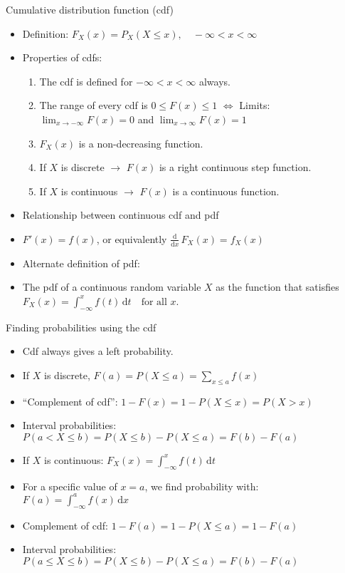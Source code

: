 \documentclass{article}
\newcommand{\ddx}[1]{\frac{\mathrm{d}}{\mathrm{d} #1}\,}		%
\newcommand{\integral}[4]{\int_{#1}^{#2} #3 \,\mathrm{d} #4}		%
\begin{document}
Cumulative distribution function (cdf)
\begin{itemize}
    \item Definition: $F_X(x) = P_X(X \le x),\quad -\infty < x < \infty$
    \item Properties of cdfs:
    \begin{enumerate}
        \item The cdf is defined for $-\infty < x < \infty$ always.
        \item The range of every cdf is $0 \le F(x) \le 1$ $\Longleftrightarrow$ Limits: $\displaystyle \lim_{x \to -\infty} F(x) = 0$ \hspace{10pt} and \hspace{10pt} $\displaystyle \lim_{x \to \infty} F(x) = 1$
        \item $F_X(x)$ is a non-decreasing function.
        \item If $X$ is discrete $\rightarrow$ $F(x)$ is a right continuous step function.
        \item[] If $X$ is continuous $\rightarrow$ $F(x)$ is a continuous function.
    \end{enumerate}
    \item Relationship between continuous cdf and pdf
    \item[] $F'(x) = f(x)$, or equivalently $\ddx{x} F_X(x) = f_X(x)$
    \item Alternate definition of pdf:
    \item[] The pdf of a continuous random variable $X$ as the function that satisfies $F_X(x) = \integral{-\infty}{x}{f(t)}{t} \quad \text{for all } x$.
\end{itemize}\vspace{50pt}

Finding probabilities using the cdf
\begin{itemize}
    \item Cdf always gives a left probability.
    \item If $X$ is discrete, $\displaystyle F(a) = P(X \le a) = \sum_{x \le a} f(x)$
    \item[] ``Complement of cdf'': $1 - F(x) = 1 -  P(X \le x) = P(X > x)$
    \item[] Interval probabilities: $P(a < X \le b) = P(X \le b) - P(X \le a) = F(b) - F(a)$
    \item If $X$ is continuous: $F_X(x) = \integral{-\infty}{x}{f(t)}{t}$
    \item[] For a specific value of $x = a$, we find probability with: $F(a) = \integral{-\infty}{a}{f(x)}{x}$
    \item[] Complement of cdf: $1 - F(a) = 1 - P(X \le a) = 1 - F(a)$
    \item[] Interval probabilities: $P(a \le X \le b) = P(X \le b) - P(X \le a) = F(b) - F(a)$
\end{itemize}\vspace{50pt}
\end{document}
